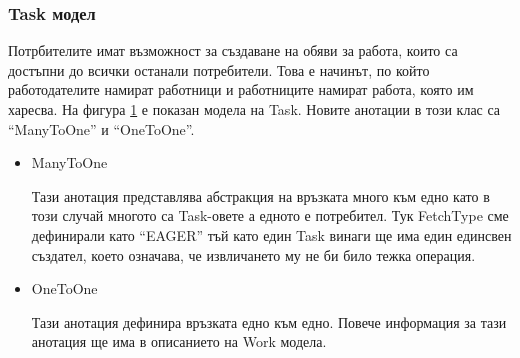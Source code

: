         
        \subsubsection{Task модел}
        Потрбителите имат възможност за създаване на обяви за работа, които са достъпни до всички останали потребители. Това е начинът, по който работодателите намират работници и работниците намират работа, която им харесва.
        На фигура \ref{fig:task_entity} е показан модела на Task. Новите анотации в този клас са ``ManyToOne'' и ``OneToOne''.
        \begin{itemize}
            \item ManyToOne
            
            Тази анотация представлява абстракция на връзката много към едно като в този случай многото са Task-овете а едното е потребител.
            Тук FetchType сме дефинирали като ``EAGER'' тъй като един Task винаги ще има един единсвен създател, което означава, че извличането му не би било тежка операция.
            \item OneToOne
            
            Тази анотация дефинира връзката едно към едно. Повече информация за тази анотация ще има в описанието на Work модела.
        \end{itemize}
        
        \begin{figure}[ht]
            \centering
            \caption{}
            \label{fig:task_entity}
        \end{figure}
        
